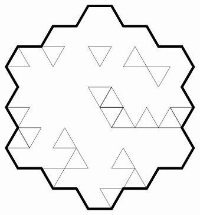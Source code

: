 \documentclass{article}\usepackage{tikz}
\begin{document}
\[
\begin{tikzpicture}
\draw[line width = 3pt] (-0.5,-4.330127018922193)--(0.5,-4.330127018922193)--(1.0,-3.4641016151377544)--(2.0,-3.4641016151377544)--(2.5,-2.598076211353316)--(3.5,-2.598076211353316)--(4.0,-1.7320508075688772)--(3.5,-0.8660254037844386)--(4.0,0.0)--(3.5,0.8660254037844386)--(4.0,1.7320508075688772)--(3.5,2.598076211353316)--(2.5,2.598076211353316)--(2.0,3.4641016151377544)--(1.0,3.4641016151377544)--(0.5,4.330127018922193)--(-0.5,4.330127018922193)--(-1.0,3.4641016151377544)--(-2.0,3.4641016151377544)--(-2.5,2.598076211353316)--(-3.5,2.598076211353316)--(-4.0,1.7320508075688772)--(-3.5,0.8660254037844386)--(-4.0,0.0)--(-3.5,-0.8660254037844386)--(-4.0,-1.7320508075688772)--(-3.5,-2.598076211353316)--(-2.5,-2.598076211353316)--(-2.0,-3.4641016151377544)--(-1.0,-3.4641016151377544)--cycle;
\draw (-3.5,-0.8660254037844386)--(-4.0,-1.7320508075688772)--(-3.0,-1.7320508075688772)--cycle;
\draw (4.0,0.0)--(3.5,-0.8660254037844386)--(3.0,0.0)--cycle;
\draw (-4.0,1.7320508075688772)--(-3.0,1.7320508075688772)--(-3.5,2.598076211353316)--cycle;
\draw (1.0,0.0)--(0.5,-0.8660254037844386)--(0.0,0.0)--cycle;
\draw (-2.0,1.7320508075688772)--(-2.5,2.598076211353316)--(-1.5,2.598076211353316)--cycle;
\draw (1.5,-2.598076211353316)--(1.0,-1.7320508075688772)--(0.5,-2.598076211353316)--cycle;
\draw (-1.5,-2.598076211353316)--(-2.0,-3.4641016151377544)--(-2.5,-2.598076211353316)--cycle;
\draw (1.0,0.0)--(0.5,0.8660254037844386)--(0.0,0.0)--cycle;
\draw (0.5,2.598076211353316)--(0.0,1.7320508075688772)--(-0.5,2.598076211353316)--cycle;
\draw (-2.0,-1.7320508075688772)--(-1.5,-0.8660254037844386)--(-1.0,-1.7320508075688772)--cycle;
\draw (-3.5,-0.8660254037844386)--(-2.5,-0.8660254037844386)--(-3.0,-1.7320508075688772)--cycle;
\draw (2.0,-3.4641016151377544)--(1.0,-3.4641016151377544)--(1.5,-2.598076211353316)--cycle;
\draw (-0.5,0.8660254037844386)--(0.5,0.8660254037844386)--(0.0,0.0)--cycle;
\draw (1.0,0.0)--(0.5,-0.8660254037844386)--(1.5,-0.8660254037844386)--cycle;
\draw (2.5,0.8660254037844386)--(2.0,1.7320508075688772)--(3.0,1.7320508075688772)--cycle;
\draw (2.5,-0.8660254037844386)--(2.0,0.0)--(1.5,-0.8660254037844386)--cycle;
\draw (0.5,-4.330127018922193)--(1.0,-3.4641016151377544)--(0.0,-3.4641016151377544)--cycle;
\draw (2.5,-0.8660254037844386)--(3.5,-0.8660254037844386)--(3.0,0.0)--cycle;
\draw (-3.5,-0.8660254037844386)--(-4.0,0.0)--(-3.0,0.0)--cycle;
\draw (2.0,1.7320508075688772)--(1.5,2.598076211353316)--(1.0,1.7320508075688772)--cycle;
\draw (-1.5,-2.598076211353316)--(-0.5,-2.598076211353316)--(-1.0,-1.7320508075688772)--cycle;

\end{tikzpicture}\]
\end{document}
